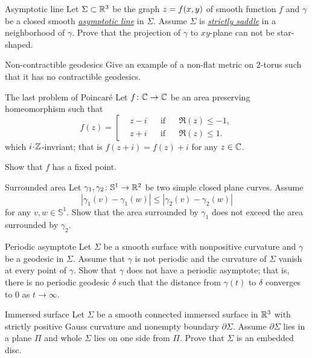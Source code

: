 \documentclass[twoside]{book}
\begin{document}
\begin{pr}{}{Asymptotic line}\label{asymptotic-line}
Let $\Sigma\subset \mathbb{R}^3$ be the graph $z\z=f(x,y)$
of smooth function $f$ 
and $\gamma$ be a closed smooth \hyperref[Asymptotic line]{\emph{asymptotic line}} in $\Sigma$.
Assume $\Sigma$ is \hyperref[Saddle surface]{\emph{strictly saddle}} in a neighborhood of $\gamma$.
Prove that the projection of $\gamma$ to $x y$-plane can not be star-shaped.
\end{pr}


\begin{pr}{\easy}{Non-contractible geodesics}\label{torus}
Give an example of a non-flat metric on $2$-torus such that it has no contractible geodesics.
\end{pr}

\begin{pr}{\hard}{The last problem of Poincar\'e}\label{The last problem of Poincare}
Let $f\colon\mathbb{C}\to \mathbb{C}$ be an area preserving homeomorphism
such that 
\[f(z)
=
\left[
\begin{aligned}
&z-i&&\text{if}&&\Re(z)\le -1,
\\
&z+i&&\text{if}&&\Re(z)\le 1.
\end{aligned}
\right.
\] 
which $i\cdot \ZZ$-invriant; that is
$f(z+i)=f(z)+i$ for any $z\in\mathbb{C}$.

Show that $f$ has a fixed point.
\end{pr}

\begin{pr}{\easy}{Surrounded area}\label{Surrounded area}
Let $\gamma_1,\gamma_2\colon\mathbb S^1\to\mathbb{R}^2$ be two simple closed plane curves.
Assume 
\[|\gamma_1(v)-\gamma_1(w)|\le|\gamma_2(v)-\gamma_2(w)|\]
for any $v,w\in \mathbb S^1$.
Show that the area surrounded by $\gamma_1$ does not exceed the area surrounded by $\gamma_2$. 
\end{pr}

\begin{pr}{}{Periodic asymptote}\label{Asymptotic geodesic}
Let $\Sigma$ be a smooth surface with nonpositive curvature
and $\gamma$ be a geodesic in $\Sigma$.
Assume that $\gamma$ is not periodic
and the curvature of $\Sigma$ vanish at every point of $\gamma$.
Show that $\gamma$ does not have a periodic asymptote;
that is, there is no periodic geodesic $\delta$ such that the distance from $\gamma(t)$ to $\delta$  converges to $0$ as $t\to\infty$. 
\end{pr}

\begin{pr}{}{Immersed surface}\label{Immersed surface}
Let $\Sigma$ be a smooth connected immersed surface in $\mathbb{R}^3$ with strictly positive Gauss curvature and nonempty boundary $\partial\Sigma$.
Assume $\partial\Sigma$ lies in a plane $\Pi$
and whole $\Sigma$ lies on one side from $\Pi$.
Prove that $\Sigma$ is an embedded disc.
\end{pr}
\end{document}
